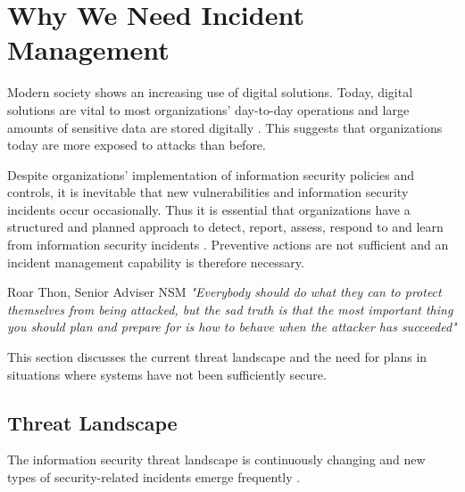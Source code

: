 \section{Why We Need Incident Management}
Modern society shows an increasing use of digital solutions. Today, digital solutions are vital to most organizations' day-to-day operations and large amounts of sensitive data are stored digitally \cite{KriposTrender}. This suggests that organizations today are more exposed to attacks than before. 

Despite organizations' implementation of information security policies and controls, it is inevitable that new vulnerabilities and information security incidents occur occasionally. Thus it is essential that organizations have a structured and planned approach to detect, report, assess, respond to and learn from information security incidents \cite{ISO/IEC27035}. Preventive actions are not sufficient and an incident management capability is therefore necessary.

\begin{newquote}{Roar Thon, Senior Adviser \acs{NSM}}
\textit{"Everybody should do what they can to protect themselves from being attacked, but the sad truth is that the most important thing you should plan and prepare for is how to behave when the attacker has succeeded"}
\end{newquote}

This section discusses the current threat landscape and the need for plans in situations where systems have not been sufficiently secure. 

\subsection{Threat Landscape}
The information security threat landscape is continuously changing and new types of security-related incidents emerge frequently \cite{nist800-61}. %

